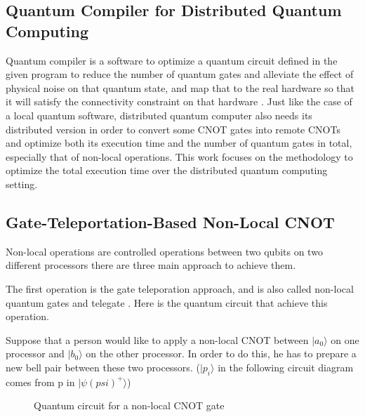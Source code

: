 \subsection{Quantum Compiler for Distributed Quantum Computing}

 Quantum compiler is a software to optimize a quantum circuit defined in the given program to reduce the number of quantum gates and alleviate the effect of physical noise on that quantum state, and map that to the real hardware so that it will satisfy the connectivity constraint on that hardware \cite{qubitallocation}.  Just like the case of a local quantum software, distributed quantum computer also needs its distributed version in order to convert some CNOT gates into remote CNOTs and optimize both its execution time and the number of quantum gates in total, especially that of non-local operations.  This work focuses on the methodology to optimize the total execution time over the distributed quantum computing setting.
 
 \subsection{Gate-Teleportation-Based Non-Local CNOT}
 
Non-local operations are controlled operations between two qubits on two different processors there are three main approach to achieve them.

The first operation is the gate teleporation approach, and is also called non-local quantum gates \cite{gateteleportation} and telegate \cite{arithmetic}.  Here is the quantum circuit that achieve this operation.

Suppose that a person would like to apply a non-local CNOT between $|a_0\rangle$ on one processor and $|b_0\rangle$ on the other processor.  In order to do this, he has to prepare a new bell pair between these two processors.  ($|p_i\rangle$ in the following circuit diagram comes from p in $|\psi (psi)^+\rangle$)

 \begin{figure}[ht]
  	\begin{center}
		\caption{Quantum circuit for a non-local CNOT gate}
	\end{center}
\end{figure}

